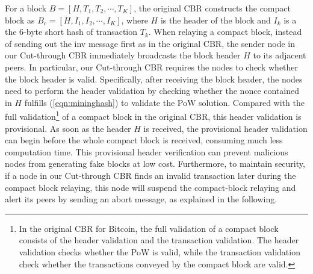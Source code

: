 \documentclass[10pt,journal,compsoc]{IEEEtran}
\begin{document}
For a block $B = \left[ {H,{T_1},{T_2}, \cdots ,{T_K}} \right]$, the original CBR constructs the compact block as ${B_c} = \left[ {H,{I_1},{I_2}, \cdots ,{I_K}} \right]$, where $H$ is the header of the block and ${I_k}$ is a the 6-byte short hash of transaction ${T_k}$. When relaying a compact block, instead of sending out the inv message first as in the original CBR, the sender node in our Cut-through CBR immediately broadcasts the block header $H$ to its adjacent peers. In particular, our Cut-through CBR requires the nodes to check whether the block header is valid. Specifically, after receiving the block header, the nodes need to perform the header validation by checking whether the nonce contained in $H$ fulfills (\ref{eqn:mininghash}) to validate the PoW solution. Compared with the full validation\footnote{In the original CBR for Bitcoin, the full validation of a compact block consists of the header validation and the transaction validation. The header validation checks whether the PoW is valid, while the transaction validation check whether the transactions conveyed by the compact block are valid.} of a compact block in the original CBR, this header validation is provisional. As soon as the header $H$ is received, the provisional header validation can begin before the whole compact block is received, consuming much less computation time. This provisional header verification can prevent malicious nodes from generating fake blocks at low cost. Furthermore, to maintain security, if a node in our Cut-through CBR finds an invalid transaction later during the compact block relaying, this node will suspend the compact-block relaying and alert its peers by sending an abort message, as explained in the following. 
\end{document}
